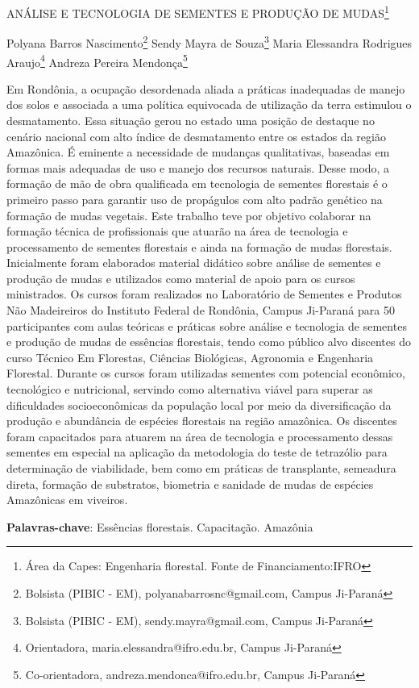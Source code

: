 \documentclass[article,12pt,onesidea,4paper,english,brazil]{abntex2}
\begin{document}
	
	
	\frenchspacing 
	
	\begin{center}
		\LARGE ANÁLISE E TECNOLOGIA DE SEMENTES E PRODUÇÃO DE MUDAS\footnote{Área da Capes: Engenharia florestal. Fonte de Financiamento:IFRO}
		
		\normalsize
		Polyana Barros Nascimento\footnote{Bolsista (PIBIC - EM), polyanabarrosnc@gmail.com, Campus Ji-Paraná} 
		Sendy Mayra de Souza\footnote{Bolsista (PIBIC - EM), sendy.mayra@gmail.com, Campus Ji-Paraná} 
		Maria Elessandra Rodrigues Araujo\footnote{Orientadora, maria.elessandra@ifro.edu.br, Campus Ji-Paraná} 
		Andreza Pereira Mendonça\footnote{Co-orientadora, andreza.mendonca@ifro.edu.br, Campus Ji-Paraná} 
	\end{center}
	
	\noindent Em Rondônia, a ocupação desordenada aliada a práticas inadequadas de manejo dos solos e associada a uma política equivocada de utilização da terra estimulou o desmatamento. Essa situação gerou no estado uma posição de destaque no cenário nacional com alto índice de desmatamento entre os estados da região Amazônica. É eminente a necessidade de mudanças qualitativas, baseadas em formas mais adequadas de uso e manejo dos recursos naturais. Desse modo, a formação de mão de obra qualificada em tecnologia de sementes florestais é o primeiro passo para garantir uso de propágulos com alto padrão genético na formação de mudas vegetais.  Este trabalho teve por objetivo colaborar na formação técnica de profissionais que atuarão na área de tecnologia e processamento de sementes florestais e ainda na formação de mudas florestais. Inicialmente foram elaborados material didático sobre análise de sementes e produção de mudas e utilizados como material de apoio para os cursos ministrados. Os cursos foram realizados no Laboratório de Sementes e Produtos Não Madeireiros do Instituto Federal de Rondônia, Campus Ji-Paraná para 50 participantes com aulas teóricas e práticas sobre análise e tecnologia de sementes e produção de mudas de essências florestais, tendo como público alvo discentes do curso Técnico Em Florestas, Ciências Biológicas, Agronomia e Engenharia Florestal. Durante os cursos foram utilizadas sementes com potencial econômico, tecnológico e nutricional, servindo como alternativa viável para superar as dificuldades socioeconômicas da população local por meio da diversificação da produção e abundância de espécies florestais na região amazônica. Os discentes foram capacitados para atuarem na área de tecnologia e processamento dessas sementes em especial na aplicação da metodologia do teste de tetrazólio para determinação de viabilidade, bem como em práticas de transplante, semeadura direta, formação de substratos, biometria e sanidade de mudas de espécies Amazônicas em viveiros.
	
	\vspace{\onelineskip}
	
	\noindent
	\textbf{Palavras-chave}: Essências florestais. Capacitação. Amazônia
	
\end{document}
